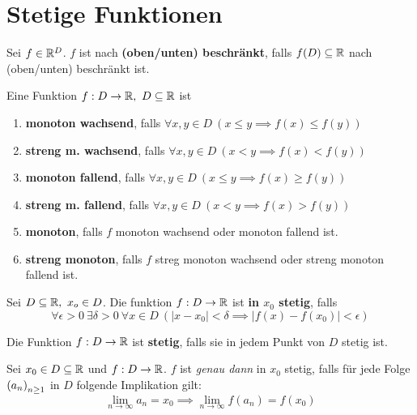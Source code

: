 \section{Stetige Funktionen}
\begin{definition}{3.1}
    Sei $f \in \mathbb{R}^D$.
    $f$ ist nach \textbf{(oben/unten) beschränkt}, falls $f(D) \subseteq \mathbb{R}$ nach (oben/unten) beschränkt ist.
\end{definition}

\begin{definition}{3.2}
    Eine Funktion $f : D \to \mathbb{R},\ D \subseteq \mathbb{R}$ ist
    \begin{enumerate}
        \item \textbf{monoton wachsend}, falls $\forall x,y \in D\ \left( x \le y \implies f(x) \le f(y) \right)$
        \item \textbf{streng m. wachsend}, falls $\forall x,y \in D\ \left( x < y \implies f(x) < f(y) \right)$
        \item \textbf{monoton fallend}, falls $\forall x,y \in D\ \left( x \le y \implies f(x) \ge f(y) \right)$
        \item \textbf{streng m. fallend}, falls $\forall x,y \in D\ \left( x < y \implies f(x) > f(y) \right)$
        \item \textbf{monoton}, falls $f$ monoton wachsend oder monoton fallend ist.
        \item \textbf{streng monoton}, falls $f$ streg monoton wachsend oder streng monoton fallend ist.
    \end{enumerate}
\end{definition}

\begin{definition}{3.4}
    Sei $D \subseteq \mathbb{R},\ x_o \in D$. Die funktion $f: D \to \mathbb{R}$ ist \textbf{in $x_0$ stetig}, falls
    \[ \forall \epsilon > 0\ \exists \delta > 0\ \forall x \in D\ \left( \left| x - x_0 \right| < \delta \implies \left| f(x) - f(x_0) \right| < \epsilon \right) \]
\end{definition}

\begin{definition}{3.5}
    Die Funktion $f: D \to \mathbb{R}$ ist \textbf{stetig}, falls sie in jedem Punkt von $D$ stetig ist.
\end{definition}

\begin{satz}{3.7}
    Sei $x_0 \in D \subseteq \mathbb{R}$ und $f: D \to \mathbb{R}$.
    $f$ ist \textit{genau dann} in $x_0$ stetig, falls für jede Folge $\left( a_n \right)_{n \ge 1}$ in $D$ folgende Implikation gilt:
    \[ \lim_{n \to \infty} a_n = x_0 \implies \lim_{n \to \infty} f(a_n) = f(x_0) \]
\end{satz}

